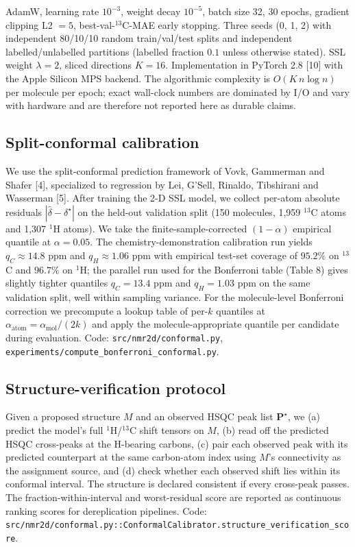 \documentclass[
  11pt,
  a4paper,
]{article}
\begin{document}
AdamW, learning rate \(10^{-3}\), weight decay \(10^{-5}\), batch size 32,
30 epochs, gradient clipping L2 \(= 5\), best-val-\(^{13}\)C-MAE early
stopping. Three seeds (0, 1, 2) with independent 80/10/10 random
train/val/test splits and independent labelled/unlabelled partitions
(labelled fraction \(0.1\) unless otherwise stated). SSL weight
\(\lambda = 2\), sliced directions \(K = 16\). Implementation in PyTorch
2.8 {[}10{]} with the Apple Silicon MPS backend. The algorithmic
complexity is \(O(K\,n \log n)\) per molecule per epoch; exact
wall-clock numbers are dominated by I/O and vary with hardware and
are therefore not reported here as durable claims.

\subsection*{Split-conformal calibration}

We use the split-conformal prediction framework of Vovk, Gammerman and
Shafer {[}4{]}, specialized to regression by Lei, G'Sell, Rinaldo,
Tibshirani and Wasserman {[}5{]}. After training the 2-D SSL model, we
collect per-atom absolute residuals
\(|\hat{\delta} - \delta^{\star}|\) on the held-out validation split
(150 molecules, 1,959 \(^{13}\)C atoms and 1,307 \(^{1}\)H atoms). We
take the finite-sample-corrected \((1-\alpha)\) empirical quantile at
\(\alpha = 0.05\). The chemistry-demonstration calibration run yields
\(q_{C} \approx 14.8\) ppm and \(q_{H} \approx 1.06\) ppm with empirical
test-set coverage of \(95.2\%\) on \(^{13}\)C and \(96.7\%\) on \(^{1}\)H;
the parallel run used for the Bonferroni table (Table 8) gives
slightly tighter quantiles \(q_{C} = 13.4\) ppm and \(q_{H} = 1.03\)
ppm on the same validation split, well within sampling variance.
For the molecule-level Bonferroni correction we precompute a lookup
table of per-\(k\) quantiles at \(\alpha_{\text{atom}} =
\alpha_{\text{mol}}/(2k)\) and apply the molecule-appropriate quantile
per candidate during evaluation. Code: \texttt{src/nmr2d/conformal.py},
\texttt{experiments/compute\_bonferroni\_conformal.py}.

\subsection*{Structure-verification protocol}

Given a proposed structure \(M\) and an observed HSQC peak list
\(\mathbf{P}^{\star}\), we (a) predict the model's full \(^{1}\)H/\(^{13}\)C
shift tensors on \(M\), (b) read off the predicted HSQC cross-peaks at
the H-bearing carbons, (c) pair each observed peak with its predicted
counterpart at the same carbon-atom index using \(M\)'s connectivity as
the assignment source, and (d) check whether each observed shift lies
within its conformal interval. The structure is declared consistent
if every cross-peak passes. The fraction-within-interval and
worst-residual score are reported as continuous ranking scores for
dereplication pipelines. Code:
\texttt{src/nmr2d/conformal.py::ConformalCalibrator.structure\_verification\_score}.
\end{document}
